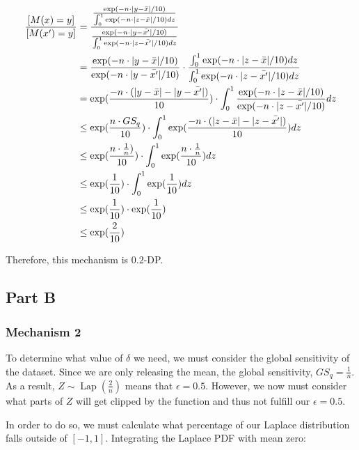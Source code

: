 \documentclass[12pt]{article}
\let\Pr\relax
\DeclareMathOperator*{\Pr}{\mathbb{P}}
\DeclareMathOperator*{\Lap}{\text{Lap}}
\begin{document}
\begin{align*}
\frac{\Pr[M(x) = y]}{\Pr[M(x') = y]} &= \frac{\frac{\exp(-n \cdot |y - \bar{x}|/10)}{\int_0^1 \exp(-n \cdot |z-\bar{x}|/10) dz}}{\frac{\exp(-n \cdot |y - \bar{x'}|/10)}{\int_0^1 \exp(-n \cdot |z-\bar{x'}|/10) dz}} \\
&= \frac{\exp(-n \cdot |y - \bar{x}|/10)}{\exp(-n \cdot |y - \bar{x'}|/10)}  \cdot \frac{\int_0^1 \exp(-n \cdot |z-\bar{x}|/10) dz}{\int_0^1 \exp(-n \cdot |z-\bar{x'}|/10) dz} \\
&= \exp(\frac{-n \cdot (|y - \bar{x}| - |y - \bar{x'}|)}{10})  \cdot \int_0^1 \frac{\exp(-n \cdot |z-\bar{x}|/10)}{\exp(-n \cdot |z-\bar{x'}|/10)} dz \\
&\leq \exp(\frac{n \cdot GS_q}{10})  \cdot \int_0^1 \exp(\frac{-n \cdot (|z-\bar{x}| - |z-\bar{x'}|)}{10}) dz \\
&\leq \exp(\frac{n \cdot \frac{1}{n})}{10})  \cdot \int_0^1 \exp(\frac{n \cdot \frac{1}{n}}{10}) dz \\
&\leq \exp(\frac{1}{10})  \cdot \int_0^1 \exp(\frac{1}{10}) dz \\
&\leq \exp(\frac{1}{10})  \cdot \exp(\frac{1}{10}) \\
&\leq \exp(\frac{2}{10}) \\
\end{align*}

Therefore, this mechanism is $0.2$-DP.

\newpage

\subsection{Part B}

\subsubsection*{Mechanism 2}

\noindent

To determine what value of $\delta$ we need, we must consider the global sensitivity of the dataset. Since we are only releasing the mean, the global sensitivity, $GS_q = \frac{1}{n}$. As a result, $Z \sim \Lap(\frac{2}{n})$ means that $\epsilon = 0.5$. However, we now must consider what parts of $Z$ will get clipped by the function and thus not fulfill our $\epsilon = 0.5$.

In order to do so, we must calculate what percentage of our Laplace distribution falls outside of $[-1, 1]$. Integrating the Laplace PDF with mean zero:
\end{document}

